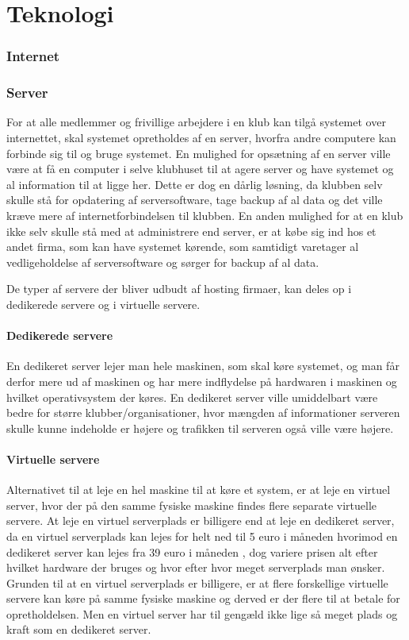 \chapter{Teknologi}\label{chap:teknologi-analyse}

\subsection*{Internet}
\subsection*{Server}
For at alle medlemmer og frivillige arbejdere i en klub kan tilgå systemet over internettet, skal systemet opretholdes af en server, hvorfra andre computere kan forbinde sig til og bruge systemet. 
En mulighed for opsætning af en server ville være at få en computer i selve klubhuset til at agere server og have systemet og al information til at ligge her. 
Dette er dog en dårlig løsning, da klubben selv skulle stå for opdatering af serversoftware, tage backup af al data og det ville kræve mere af internetforbindelsen til klubben. 
En anden mulighed for at en klub ikke selv skulle stå med at administrere end server, er at købe sig ind hos et andet firma, som kan have systemet kørende, som samtidigt varetager al vedligeholdelse af serversoftware og sørger for backup af al data.

De typer af servere der bliver udbudt af hosting firmaer, kan deles op i dedikerede servere og i virtuelle servere.
\subsubsection*{Dedikerede servere}
En dedikeret server lejer man hele maskinen, som skal køre systemet, og man får derfor mere ud af maskinen og har mere indflydelse på hardwaren i maskinen og hvilket operativsystem der køres.
En dedikeret server ville umiddelbart være bedre for større klubber/organisationer, hvor mængden af informationer serveren skulle kunne indeholde er højere og trafikken til serveren også ville være højere.
\subsubsection*{Virtuelle servere}
Alternativet til at leje en hel maskine til at køre et system, er at leje en virtuel server, hvor der på den samme fysiske maskine findes flere separate virtuelle servere. At leje en virtuel serverplads er billigere end at leje en dedikeret server, da en virtuel serverplads kan lejes for helt ned til 5 euro i måneden\citep{Virtuelserver} hvorimod en dedikeret server kan lejes fra 39 euro i måneden \citep{Dedikeretserver}, dog variere prisen alt efter hvilket hardware der bruges og hvor efter hvor meget serverplads man ønsker. 
Grunden til at en virtuel serverplads er billigere, er at flere forskellige virtuelle servere kan køre på samme fysiske maskine og derved er der flere til at betale for opretholdelsen. 
Men en virtuel server har til gengæld ikke lige så meget plads og kraft som en dedikeret server. 

